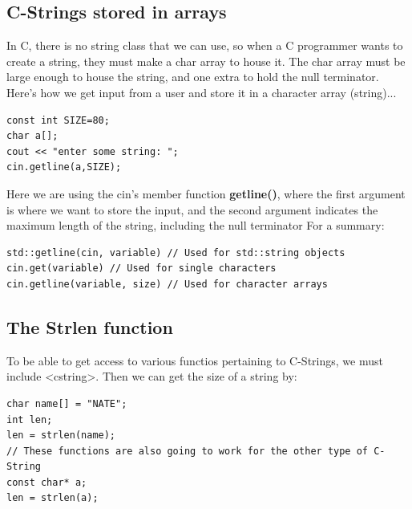 \documentclass{report}
\begin{document}
    \pagebreak \bigbreak \noindent 
    \subsection{C-Strings stored in arrays}
    \bigbreak \noindent 
    In C, there is no string class that we can use, so when a C programmer wants to create a string, they must make a char array to house it. The char array must be large enough to house the string, and one extra to hold the null terminator.
    \bigbreak \noindent 
    Here's how we get input from a user and store it in a character array (string)...
    \bigbreak \noindent 
    \sepline
    \begin{verbatim}
const int SIZE=80;
char a[];
cout << "enter some string: ";
cin.getline(a,SIZE);
    \end{verbatim}
    \sepline
    \bigbreak \noindent 
    Here we are using the cin's member function \textbf{getline()}, where the first argument is where we want to store the input, and the second argument indicates the maximum length of the string, including the null terminator
    \bigbreak \noindent 
    For a summary:
    \bigbreak \noindent 
    \sepline
    \begin{verbatim}
std::getline(cin, variable) // Used for std::string objects
cin.get(variable) // Used for single characters
cin.getline(variable, size) // Used for character arrays
    \end{verbatim}
    \sepline
    \bigbreak \noindent 

    \bigbreak \noindent 
    \subsection{The Strlen function}
    \bigbreak \noindent 
    To be able to get access to various functios pertaining to C-Strings, we must include <cstring>. Then we can get the size of a string by:
    \bigbreak \noindent 
    \sepline
    \begin{verbatim}
char name[] = "NATE";
int len;
len = strlen(name);
// These functions are also going to work for the other type of C-String
const char* a;
len = strlen(a);
    \end{verbatim}
    \sepline
    \bigbreak \noindent 


    \pagebreak \bigbreak \noindent 
\end{document}
